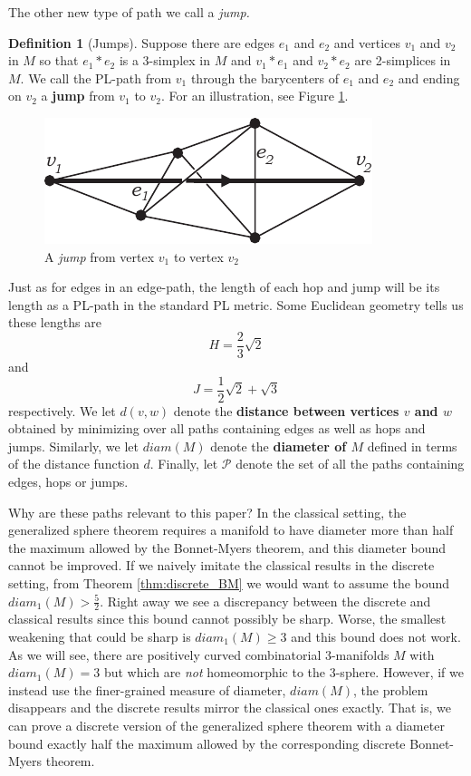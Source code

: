 \documentclass[12pt]{article}
\theoremstyle{plain}
\theoremstyle{definition}
\newtheorem{definition}[theorem]{Definition}
\theoremstyle{remark}
\begin{document}
\noindent The other new type of path we call a {\em jump.}

\begin{definition}[Jumps] Suppose there are edges $e_1$ and $e_2$ and vertices $v_1$ and $v_2$ in $M$ so that $e_1*e_2$ is a 3-simplex in $M$ and $v_1*e_1$ and $v_2*e_2$ are 2-simplices in $M$. We call the PL-path from $v_1$ through the barycenters of $e_1$ and $e_2$ and ending on $v_2$ a \textbf{jump} from $v_1$ to $v_2$. For an illustration, see Figure \ref{fig:jump}.
\end{definition}

\begin{figure}
	\centering
		\includegraphics[width=0.36\linewidth]{figures/jump.pdf}
    \caption{A {\em jump} from vertex $v_1$ to vertex $v_2$}
    \label{fig:jump}
\end{figure}

Just as for edges in an edge-path, the length of each hop and jump will be its length as a PL-path in the standard PL metric. Some Euclidean geometry tells us these lengths are \begin{equation} \label{eqn:hop_length} H = \frac{2}{3}\sqrt{2} \end{equation} and \begin{equation} \label{eqn:jump_length} J = \frac{1}{2}\sqrt{2} + \sqrt{3} \end{equation} respectively. We let $d(v,w)$ denote the \textbf{distance between vertices $v$ and $w$} obtained by minimizing over all paths containing edges as well as hops and jumps. Similarly, we let $diam(M)$ denote the \textbf{diameter of $M$} defined in terms of the distance function $d$. Finally, let $\mathcal{P}$ denote the set of all the paths containing edges, hops or jumps.

Why are these paths relevant to this paper? In the classical setting, the generalized sphere theorem requires a manifold to have diameter more than half the maximum allowed by the Bonnet-Myers theorem, and this diameter bound cannot be improved. If we naively imitate the classical results in the discrete setting, from Theorem \ref{thm:discrete_BM} we would want to assume the bound $diam_1(M)>\frac{5}{2}$. Right away we see a discrepancy between the discrete and classical results since this bound cannot possibly be sharp. Worse, the smallest weakening that could be sharp is $diam_1(M) \geq 3$ and this bound does not work. As we will see, there are positively curved combinatorial 3-manifolds $M$ with $diam_1(M)=3$ but which are {\em not} homeomorphic to the 3-sphere. However, if we instead use the finer-grained measure of diameter, $diam(M)$, the problem disappears and the discrete results mirror the classical ones exactly. That is, we can prove a discrete version of the generalized sphere theorem with a diameter bound exactly half the maximum allowed by the corresponding discrete Bonnet-Myers theorem.
\end{document}
